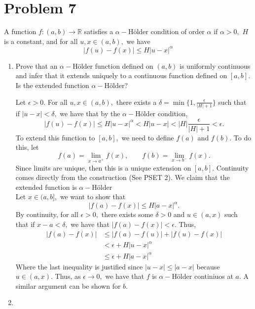 \documentclass[11pt]{article}
\newcommand{\bbR}{\mathbb{R}}
\begin{document}
\newpage
\section*{Problem 7}
\begin{problem}
    A function $f: (a,b) \to \bbR$ satisfies a $\alpha-$H\"{o}lder condition of order $\alpha$ if $\alpha>0,$ $H$ is a constant, and for all $u,x\in (a,b),$ we have 
    \[|f(u) - f(x)|\leq H|u-x|^\alpha\]
\end{problem}
\begin{enumerate}
    \item 
    \begin{problem}
        Prove that an $\alpha-$H\"{o}lder function defined on $(a,b)$ is uniformly continuous and infer that it extends uniquely to a continuous function defined on
        $[a, b].$ Is the extended function $\alpha-$H\"{o}lder?
    \end{problem}
    \begin{solution}
        Let $\epsilon>0.$ For all $u,x\in (a,b),$ there exists a $\delta = \min\{1, \frac{\epsilon}{|H| +1}\}$ such that if $|u-x|<\delta,$ we have that by the $\alpha-$H\"{o}lder condition,
        \[|f(u) - f(x)|\leq H|u-x|^\alpha < H|u-x|< |H| \frac{\epsilon}{|H|+1}<\epsilon.\]
        To extend this function to $[a,b],$ we need to define $f(a)$ and $f(b).$ To do this, let 
        \[f(a) = \lim_{x \to a^{+}}f(x),\qquad f(b) = \lim_{x \to b^{-}}f(x).\] Since limits are unique, then this is a unique extension on $[a,b].$ Continuity comes directly from the construction (See PSET 2). We claim that the extended function is $\alpha-$H\"{o}lder\\
        Let $x\in (a,b],$ we want to show that \[|f(a) - f(x)|\leq H|a-x|^\alpha.\] By continuity, for all $\epsilon>0,$ there exists some $\delta>0$ and $u\in (a,x)$ such that if $x-a<\delta,$ we have that $|f(a) - f(x)|<\epsilon.$ Thus,
        \begin{align*}
            |f(a) - f(x)|&\leq |f(a) - f(u)| + |f(u) - f(x)|\\
            &< \epsilon + H|u-x|^\alpha \\
            &\leq \epsilon + H|a-x|^\alpha
        \end{align*}
        Where the last inequality is justified since $|u-x|\leq |a-x|$ because $u\in (a,x).$ Thus, as $\epsilon\to 0,$ we have that $f$ is $\alpha-$H\"{o}lder continiuos at $a.$ A similar argument can be shown for $b.$
    \end{solution}
    \item

\end{enumerate}
\end{document}

